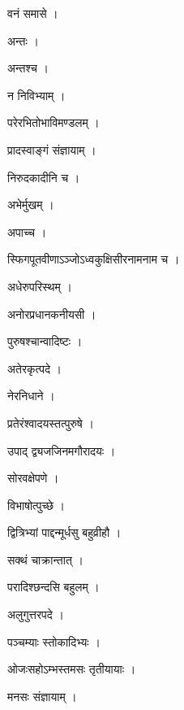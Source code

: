 \documentclass[10pt, openany]{book}
\begin{document}
\noindent वनं समासे ।

\noindent अन्तः ।

\noindent अन्तश्च ।

\noindent न निविभ्याम् ।

\noindent परेरभितोभाविमण्डलम् ।

\noindent प्रादस्वाङ्गं संज्ञायाम् ।

\noindent निरुदकादीनि च ।

\noindent अभेर्मुखम् ।

\noindent अपाच्च ।

\noindent स्फिगपूतवीणाऽञ्जोऽध्वकुक्षिसीरनामनाम च ।

\noindent अधेरुपरिस्थम् ।

\noindent अनोरप्रधानकनीयसी ।

\noindent पुरुषश्चान्वादिष्टः ।

\noindent अतेरकृत्पदे ।

\noindent नेरनिधाने ।

\noindent प्रतेरंश्वादयस्तत्पुरुषे ।

\noindent उपाद् द्व्यजजिनमगौरादयः ।

\noindent सोरवक्षेपणे ।

\noindent विभाषोत्पुच्छे ।

\noindent द्वित्रिभ्यां पाद्दन्मूर्धसु बहुव्रीहौ ।

\noindent सक्थं चाक्रान्तात् ।

\noindent परादिश्छन्दसि बहुलम् ।

\noindent अलुगुत्तरपदे ।

\noindent पञ्चम्याः स्तोकादिभ्यः ।

\noindent ओजःसहोऽम्भस्तमसः तृतीयायाः ।

\noindent मनसः संज्ञायाम् ।
\end{document}

